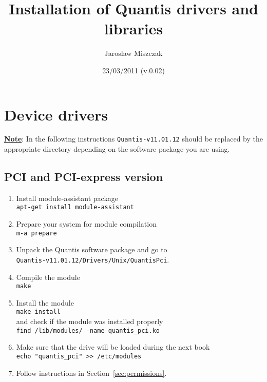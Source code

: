 \documentclass[a4paper]{scrartcl}
\title{Installation of Quantis drivers and libraries}
\author{Jaroslaw Miszczak}
\date{23/03/2011 (v.0.02)}
\begin{document}
\maketitle


\section{Device drivers}

\textbf{\underline{Note}}: In the following instructions
\texttt{Quantis-v11.01.12} should be replaced by the appropriate directory
depending on the software package you are using.
\subsection{PCI and PCI-express version}
\begin{enumerate}
    \item Install module-assistant package\\ \texttt{apt-get install
    module-assistant} 
    \item Prepare your system for module compilation\\ \texttt{m-a prepare}
    \item Unpack the Quantis software package and go to\\
    \texttt{Quantis-v11.01.12/Drivers/Unix/QuantisPci}.
    \item Compile the module\\ \texttt{make}
    \item Install the module\\ \texttt{make install}\\ and check if the module was
    installed properly\\ \texttt{find /lib/modules/ -name quantis\_pci.ko}
    \item Make sure that the drive will be loaded during the next book \\ \texttt{echo "quantis\_pci" >> /etc/modules}
    \item Follow instructions in Section~\ref{sec:permissions}.
\end{enumerate}

\end{document}
